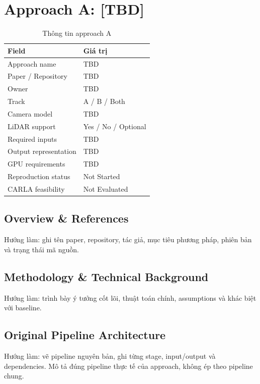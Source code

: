 \chapter{Approach A: [TBD]}

\begin{table}[H]
  \centering
  \caption{Thông tin approach A}
  \begin{tabularx}{\linewidth}{l X}
    \toprule
    \textbf{Field} & \textbf{Giá trị} \\
    \midrule
    Approach name & TBD \\
    Paper / Repository & TBD \\
    Owner & TBD \\
    Track & A / B / Both \\
    Camera model & TBD \\
    LiDAR support & Yes / No / Optional \\
    Required inputs & TBD \\
    Output representation & TBD \\
    GPU requirements & TBD \\
    Reproduction status & Not Started \\
    CARLA feasibility & Not Evaluated \\
    \bottomrule
  \end{tabularx}
\end{table}

\section{Overview \& References}

Hướng làm: ghi tên paper, repository, tác giả, mục tiêu phương pháp, phiên bản và trạng thái mã nguồn.

\section{Methodology \& Technical Background}

Hướng làm: trình bày ý tưởng cốt lõi, thuật toán chính, assumptions và khác biệt với baseline.

\section{Original Pipeline Architecture}

Hướng làm: vẽ pipeline nguyên bản, ghi từng stage, input/output và dependencies.
Mô tả đúng pipeline thực tế của approach, không ép theo pipeline chung.

